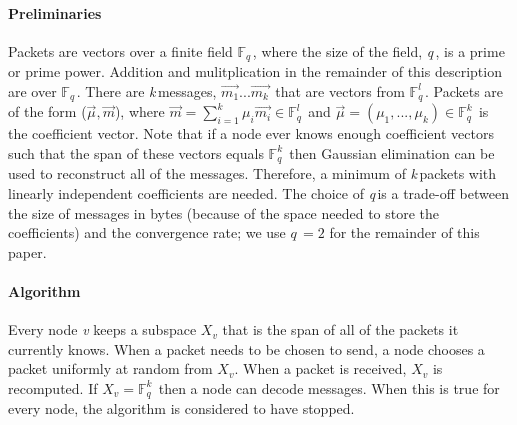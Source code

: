 \documentclass{article} %
\def\numMessages{\textit{k}\,}
\def\fieldSize{\textit{q}\,}
\begin{document}
\paragraph{Preliminaries}
Packets are vectors over a finite field $\mathbb{F}_{\fieldSize}$, where the size of the field, \fieldSize, is a prime or prime power. Addition and mulitplication in the remainder of this description are over $\mathbb{F}_{\fieldSize}$. There are \numMessages messages, $\vec{m_{1}}...\vec{m_{\numMessages}}$ that are vectors from $\mathbb{F}_{\fieldSize}^{l}$. Packets are of the form ($\vec{\mu}, \vec{m}$), where $\vec{m} = \sum_{i=1}^{\numMessages} \mu_i\vec{m_i} \in \mathbb{F}_{\fieldSize}^{l}$ and $\vec{\mu} = (\mu_1,...,\mu_k) \in \mathbb{F}_{\fieldSize}^{\numMessages}$ is the coefficient vector. Note that if a node ever knows enough coefficient vectors such that the span of these vectors equals $\mathbb{F}_{\fieldSize}^{\numMessages}$ then Gaussian elimination can be used to reconstruct all of the messages. Therefore, a minimum of \numMessages packets with linearly independent coefficients are needed. The choice of \fieldSize is a trade-off between the size of messages in bytes (because of the space needed to store the coefficients) and the convergence rate; we use $\fieldSize=2$ for the remainder of this paper. 
\paragraph{Algorithm}
Every node \textit{v} keeps a subspace $X_v$ that is the span of all of the packets it currently knows. When a packet needs to be chosen to send, a node chooses a packet uniformly at random from $X_v$. When a packet is received, $X_v$ is recomputed. If $X_v = \mathbb{F}_{\fieldSize}^{\numMessages}$ then a node can decode messages. When this is true for every node, the algorithm is considered to have stopped. 
\end{document}
